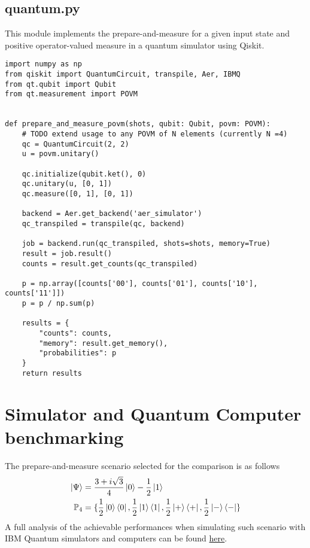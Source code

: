 \subsection{quantum.py}\label{section:listings_quantum}
This module implements the prepare-and-measure for a given input state and positive operator-valued measure in a quantum simulator using Qiskit. 
\begin{verbatim}
import numpy as np
from qiskit import QuantumCircuit, transpile, Aer, IBMQ
from qt.qubit import Qubit
from qt.measurement import POVM


def prepare_and_measure_povm(shots, qubit: Qubit, povm: POVM):
    # TODO extend usage to any POVM of N elements (currently N =4)
    qc = QuantumCircuit(2, 2)
    u = povm.unitary()

    qc.initialize(qubit.ket(), 0)
    qc.unitary(u, [0, 1])
    qc.measure([0, 1], [0, 1])

    backend = Aer.get_backend('aer_simulator')
    qc_transpiled = transpile(qc, backend)

    job = backend.run(qc_transpiled, shots=shots, memory=True)
    result = job.result()
    counts = result.get_counts(qc_transpiled)

    p = np.array([counts['00'], counts['01'], counts['10'], counts['11']])
    p = p / np.sum(p)

    results = {
        "counts": counts,
        "memory": result.get_memory(),
        "probabilities": p
    }
    return results
\end{verbatim}
\newpage
\section{Simulator and Quantum Computer benchmarking}\label{section:benchmark}
The prepare-and-measure scenario selected for the comparison is as follows
\begin{equation}
\begin{split}
\ket{\Psi}&=\frac{3 + i \sqrt{3}}{4} \ket{0} - \frac{1}{2} \ket{1}\\
\mathbb{P}_4&=\{\frac{1}{2}\ket{0}\bra{0}, \frac{1}{2}\ket{1}\bra{1}, \frac{1}{2}\ket{+}\bra{+}, \frac{1}{2}\ket{-}\bra{-} \}
\end{split}
\end{equation}
A full analysis of the achievable performances when simulating such scenario with IBM Quantum simulators and computers can be found \href{https://github.com/inaki-ortizdelandaluce/qubit-communication-simulations/blob/main/tex/xls/qc_probabilities_summary.xlsx}{here}.
